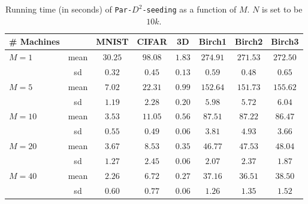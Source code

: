 \begin{table}[h]
\centering
\begin{tabular}{| l | c | c | c | c | c | c | c |}
\hline
{\bf \# Machines} & & {\bf MNIST} & {\bf CIFAR} & {\bf 3D} & {\bf Birch1} & {\bf Birch2} & {\bf Birch3} \\
\hline \hline
\multirow{2}{*}{$M=1$} & mean & 
$30.25$ & $98.08$ & $1.83$ & $274.91$ & $271.53$ & $272.50$\\ \cline{2-8}
& \small{sd} & ${\scriptstyle 0.32}$ & ${\scriptstyle 0.45}$ & ${\scriptstyle 0.13}$ & ${\scriptstyle 0.59}$ & ${\scriptstyle 0.48}$ & ${\scriptstyle 0.65}$\\
\hline \hline 
\multirow{2}{*}{$M=5$} & mean & 
$7.02$ & $22.31$ & $0.99$ & $152.64$ & $151.73$ & $155.62$\\ \cline{2-8}
& \small{sd} & ${\scriptstyle 1.19}$ & ${\scriptstyle 2.28}$ & ${\scriptstyle 0.20}$ & ${\scriptstyle 5.98}$ & ${\scriptstyle 5.72}$ & ${\scriptstyle 6.04}$\\
\hline \hline 
\multirow{2}{*}{$M = 10$} & mean & 
$3.53$ & $11.05$ & $0.56$ & $87.51$ & $87.22$ & $86.47$\\ \cline{2-8}
& \small{sd} & ${\scriptstyle 0.55}$ & ${\scriptstyle 0.49}$ & ${\scriptstyle 0.06}$ & ${\scriptstyle 3.81}$ & ${\scriptstyle 4.93}$ & ${\scriptstyle 3.66}$\\
\hline \hline 
\multirow{2}{*}{$M = 20$} & mean & 
$3.67$ & $8.53$ & $0.35$ & $46.77$ & $47.53$ & $48.04$\\ \cline{2-8}
& \small{sd} & ${\scriptstyle 1.27}$ & ${\scriptstyle 2.45}$ & ${\scriptstyle 0.06}$ & ${\scriptstyle 2.07}$ & ${\scriptstyle 2.37}$ & ${\scriptstyle 1.87}$\\
\hline \hline 
\multirow{2}{*}{$M=40$} & mean & 
$2.26$ & $6.72$ & $0.27$ & $37.16$ & $36.51$ & $38.50$\\ \cline{2-8}
& \small{sd} & ${\scriptstyle 0.60}$ & ${\scriptstyle 0.77}$ & ${\scriptstyle 0.06}$ & ${\scriptstyle 1.26}$ & ${\scriptstyle 1.35}$ & ${\scriptstyle 1.52}$\\
\hline 
\end{tabular}
\caption{Running time (in seconds) of \texttt{Par-$D^2$-seeding} as a function of $M$. $N$ is set to be $10k$.}
\end{table}